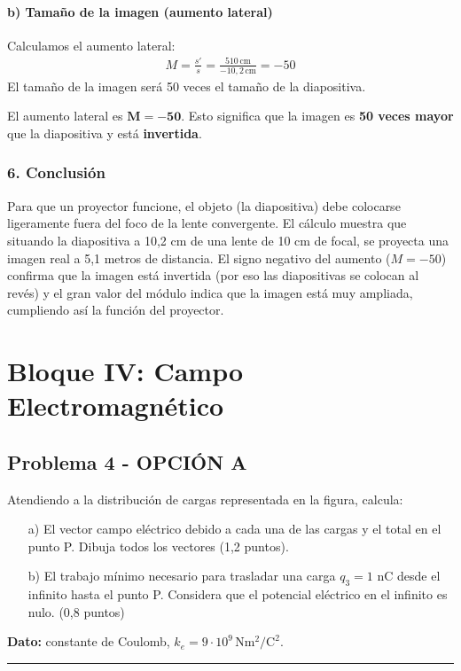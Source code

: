 \paragraph{b) Tamaño de la imagen (aumento lateral)}
Calculamos el aumento lateral:
\begin{gather}
    M = \frac{s'}{s} = \frac{510 \, \text{cm}}{-10,2 \, \text{cm}} = -50
\end{gather}
El tamaño de la imagen será 50 veces el tamaño de la diapositiva.
\begin{cajaresultado}
El aumento lateral es $\boldsymbol{M=-50}$. Esto significa que la imagen es \textbf{50 veces mayor} que la diapositiva y está \textbf{invertida}.
\end{cajaresultado}

\subsubsection*{6. Conclusión}
\begin{cajaconclusion}
Para que un proyector funcione, el objeto (la diapositiva) debe colocarse ligeramente fuera del foco de la lente convergente. El cálculo muestra que situando la diapositiva a 10,2 cm de una lente de 10 cm de focal, se proyecta una imagen real a 5,1 metros de distancia. El signo negativo del aumento ($M=-50$) confirma que la imagen está invertida (por eso las diapositivas se colocan al revés) y el gran valor del módulo indica que la imagen está muy ampliada, cumpliendo así la función del proyector.
\end{cajaconclusion}

\newpage

\section{Bloque IV: Campo Electromagnético}
\label{sec:em_2018_jun_ord}
\subsection{Problema 4 - OPCIÓN A}
\label{subsec:4A_2018_jun_ord}
\begin{cajaenunciado}
Atendiendo a la distribución de cargas representada en la figura, calcula:
\begin{itemize}
    \item[a)] El vector campo eléctrico debido a cada una de las cargas y el total en el punto P. Dibuja todos los vectores (1,2 puntos).
    \item[b)] El trabajo mínimo necesario para trasladar una carga $q_{3}=1$ nC desde el infinito hasta el punto P. Considera que el potencial eléctrico en el infinito es nulo. (0,8 puntos)
\end{itemize}
\textbf{Dato:} constante de Coulomb, $k_{e}=9\cdot10^{9}\,\text{N}\text{m}^2/\text{C}^2$.
\end{cajaenunciado}
\hrule

